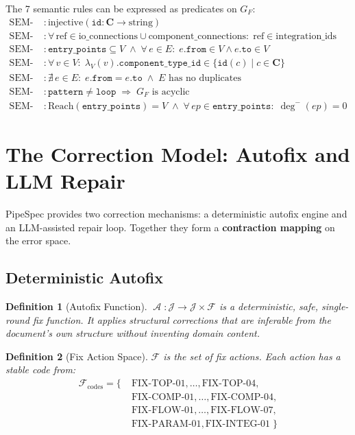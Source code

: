 \documentclass[11pt,a4paper]{article}
\newtheorem{definition}{Definition}[section]
\theoremstyle{definition}
\DeclareMathOperator{\Autofix}{\mathcal{A}}
\newcommand{\jspace}{\mathcal{J}}
\newcommand{\fixs}{\mathcal{F}}
\begin{document}
The 7 semantic rules can be expressed as predicates on $G_F$:
\begin{align}
\text{SEM-01} &: \text{injective}(\texttt{id} : \mathbf{C} \to \text{string}) \\
\text{SEM-02} &: \forall\, \text{ref} \in \text{io\_connections} \cup \text{component\_connections}:\; \text{ref} \in \text{integration\_ids} \\
\text{SEM-03} &: \texttt{entry\_points} \subseteq V \;\land\; \forall\, e \in E:\; e.\texttt{from} \in V \land e.\texttt{to} \in V \\
\text{SEM-04} &: \forall\, v \in V:\; \lambda_V(v).\texttt{component\_type\_id} \in \{\texttt{id}(c) \mid c \in \mathbf{C}\} \\
\text{SEM-05} &: \nexists\, e \in E:\; e.\texttt{from} = e.\texttt{to} \;\land\; E \text{ has no duplicates} \\
\text{SEM-06} &: \texttt{pattern} \neq \texttt{loop} \;\Longrightarrow\; G_F \text{ is acyclic} \\
\text{SEM-07} &: \text{Reach}(\texttt{entry\_points}) = V \;\land\; \forall\, ep \in \texttt{entry\_points}:\; \deg^-(ep) = 0
\end{align}

\section{The Correction Model: Autofix and LLM Repair}

PipeSpec provides two correction mechanisms: a deterministic autofix engine and an LLM-assisted repair loop. Together they form a \textbf{contraction mapping} on the error space.

\subsection{Deterministic Autofix}
\begin{definition}[Autofix Function]
$\Autofix : \jspace \to \jspace \times \fixs$ is a deterministic, safe, single-round fix function. It applies structural corrections that are inferable from the document's own structure without inventing domain content.
\end{definition}

\begin{definition}[Fix Action Space]
$\fixs$ is the set of fix actions. Each action has a stable code from:
\begin{align}
\mathcal{F}_{\text{codes}} = \{\; &\text{FIX-TOP-01}, \dots, \text{FIX-TOP-04}, \\
&\text{FIX-COMP-01}, \dots, \text{FIX-COMP-04}, \\
&\text{FIX-FLOW-01}, \dots, \text{FIX-FLOW-07}, \\
&\text{FIX-PARAM-01}, \text{FIX-INTEG-01} \;\}
\end{align}
\end{definition}
\end{document}
